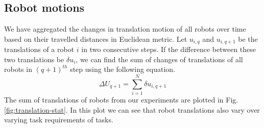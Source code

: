 \documentclass[journal]{IEEEtran}
\begin{document}
\subsection{Robot motions}
We have aggregated the changes in translation motion of all robots over time based on their travelled distances in Euclidean metric. Let $u_{i,q}$ and $u_{i,q+1}$ be the translations of a robot $i$ in two consecutive steps. If the difference between these two translations be $\delta u_{i}$, we can find the sum of changes of translations of all robots in $(q+1)^{th}$ step using the following equation.
\begin{equation}
\Delta U_{q+1} = \sum_{i=1}^{N} \delta u_{i, q+1} 
\label{eqn:Delta-Tr}
\end{equation}
The sum of translations of robots from our experiments are plotted in Fig. \ref{fig:translation-stat}. In this plot we can see that robot translations also vary over varying task requirements of tasks.
\end{document}
